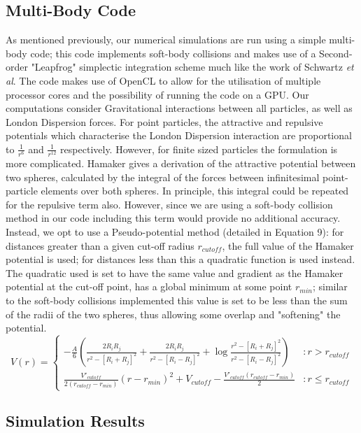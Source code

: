 \documentclass[letterpaper, preprint, paper,11pt]{AAS}	%
\begin{document}
\subsection{Multi-Body Code}
As mentioned previously, our numerical simulations are run using a simple multi-body code; this code implements soft-body collisions and makes use of a Second-order "Leapfrog" simplectic integration scheme much like the work of Schwartz \textit{et al}\cite{soft}. The code makes use of OpenCL to allow for the utilisation of multiple processor cores and the possibility of running the code on a GPU. Our computations consider Gravitational interactions between all particles, as well as London Dispersion forces. For point particles, the attractive and repulsive potentials which characterise the London Dispersion interaction are proportional to $\frac{1}{r^6}$ and $\frac{1}{r^{12}}$ respectively. However, for finite sized particles the formulation is more complicated. Hamaker\cite{hamaker} gives a derivation of the attractive potential between two spheres, calculated by the integral of the forces between infinitesimal point-particle elements over both spheres. In principle, this integral could be repeated for the repulsive term also. However, since we are using a soft-body collision method in our code including this term would provide no additional accuracy. Instead, we opt to use a Pseudo-potential method (detailed in Equation 9): for distances greater than a given cut-off radius $r_{cutoff}$, the full value of the Hamaker potential is used; for distances less than this a quadratic function is used instead. The quadratic used is set to have the same value and gradient as the Hamaker potential at the cut-off point, has a global minimum at some point $r_{min}$; similar to the soft-body collisions implemented this value is set to be less than the sum of the radii of the two spheres, thus allowing some overlap and "softening" the potential. 
\begin{equation}
V(r) = \left\{
\begin{array}{lr}
-\frac{A}{6}\left(\frac{2R_iR_j}{r^2-[R_i+R_j]^2}+\frac{2R_iR_j}{r^2-[R_i-R_j]^2}+\log\frac{r^2-[R_i+R_j]^2}{r^2-[R_i-R_j]^2}\right) & : r > r_{cutoff}\\
\frac{V'_{cutoff}}{2(r_{cutoff}-r_{min})}(r-r_{min})^2+V_{cutoff} - \frac{V'_{cutoff}(r_{cutoff}-r_{min})}{2} & : r \leq r_{cutoff}
\end{array}
\right.
\end{equation}

\subsection{Simulation Results}
\end{document}
